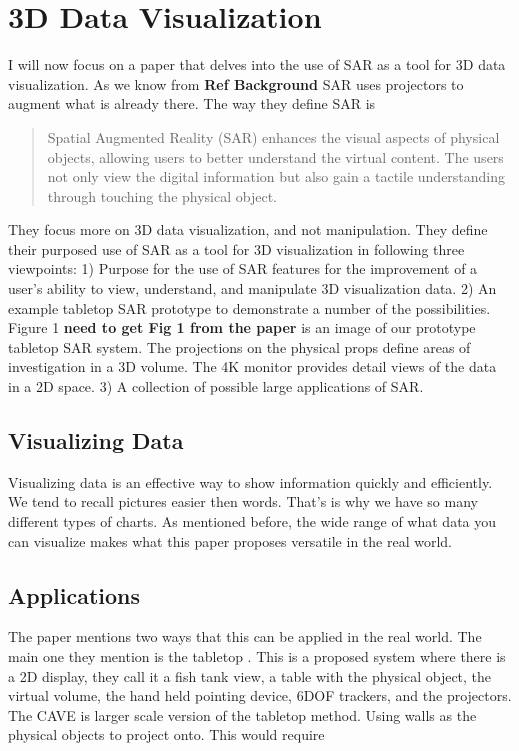\documentclass{sig-alternate}
\begin{document}
\section{3D Data Visualization}
\label{sec:3D Data Visualization}

I will now focus on a paper that delves into the use of SAR as a tool for 3D data visualization. As we know from \textbf{Ref Background} SAR uses projectors to augment what is already there. The way they define SAR is 
\begin{quote}
Spatial Augmented Reality (SAR) enhances the visual aspects of physical objects, allowing users to better understand the virtual content. The users not only view the digital information but also gain a tactile understanding through touching the physical object. 
\end{quote}

They focus more on 3D data visualization, and not manipulation. They define their purposed use of SAR as a tool for 3D visualization in following three viewpoints: 1) Purpose for the use of SAR features for the improvement of a user's ability to view, understand, and manipulate 3D visualization data. 2) An example tabletop SAR prototype to demonstrate a number of the possibilities. Figure 1 \textbf{need to get Fig 1 from the paper} is an image of our prototype tabletop SAR system. The projections on the physical props define areas of investigation in a 3D volume. The 4K monitor provides detail views of the data in a 2D space. 3) A collection of possible large applications of SAR.
\subsection{Visualizing Data}
\label{sec:Visualizing Data}

Visualizing data is an effective way to show information quickly and efficiently. We tend to recall pictures easier then words. That's is why we have so many different types of charts. As mentioned before, the wide range of what data you can visualize makes what this paper proposes versatile in the real world.      

\subsection{Applications}
\label{sec:Applications}

The paper mentions two ways that this can be applied in the real world. The main one they mention is the tabletop . This is a proposed system where there is a 2D display, they call it a fish tank view, a table with the physical object, the virtual volume, the hand held pointing device, 6DOF trackers, and the projectors. The CAVE is larger scale version of the tabletop method. Using walls as the physical objects to project onto. This would require   
\end{document}
